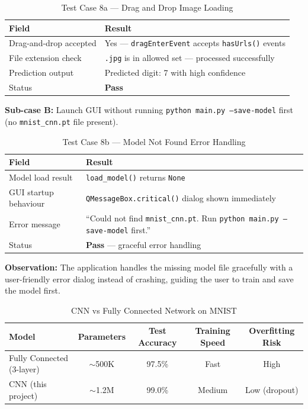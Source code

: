 \documentclass[12pt,a4paper,openany]{report}
\begin{document}
\begin{table}[H]
\centering
\begin{tabular}{|l|p{9cm}|}
\hline
\textbf{Field}          & \textbf{Result} \\
\hline
Drag-and-drop accepted  & Yes --- \texttt{dragEnterEvent} accepts \texttt{hasUrls()} events \\
File extension check    & \texttt{.jpg} is in allowed set --- processed successfully \\
Prediction output       & Predicted digit: 7 with high confidence \\
Status                  & \textbf{Pass} \\
\hline
\end{tabular}
\caption{Test Case 8a --- Drag and Drop Image Loading}
\end{table}

\textbf{Sub-case B:} Launch GUI without running \texttt{python main.py --save-model} first (no \texttt{mnist\_cnn.pt} file present).

\begin{table}[H]
\centering
\begin{tabular}{|l|p{9cm}|}
\hline
\textbf{Field}          & \textbf{Result} \\
\hline
Model load result       & \texttt{load\_model()} returns \texttt{None} \\
GUI startup behaviour   & \texttt{QMessageBox.critical()} dialog shown immediately \\
Error message           & ``Could not find \texttt{mnist\_cnn.pt}. Run \texttt{python main.py --save-model} first.'' \\
Status                  & \textbf{Pass} --- graceful error handling \\
\hline
\end{tabular}
\caption{Test Case 8b --- Model Not Found Error Handling}
\end{table}

\textbf{Observation:} The application handles the missing model file gracefully with a user-friendly error dialog instead of crashing, guiding the user to train and save the model first.

\begin{table}[H]
\centering
\begin{tabular}{|l|c|c|c|c|}
\hline
\textbf{Model}              & \textbf{Parameters} & \textbf{Test Accuracy} & \textbf{Training Speed} & \textbf{Overfitting Risk} \\
\hline
Fully Connected (3-layer)   & $\sim$500K          & 97.5\%                 & Fast                    & High \\
CNN (this project)          & $\sim$1.2M          & 99.0\%                 & Medium                  & Low (dropout) \\
\hline
\end{tabular}
\caption{CNN vs Fully Connected Network on MNIST}
\end{table}
\end{document}
